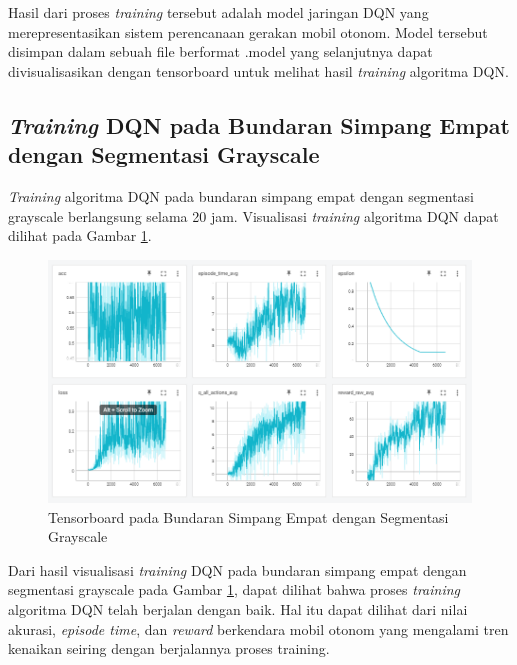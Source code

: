 Hasil dari proses \textit{training} tersebut adalah model jaringan DQN yang merepresentasikan sistem perencanaan gerakan mobil otonom. Model tersebut disimpan dalam sebuah file berformat .model yang selanjutnya dapat divisualisasikan dengan tensorboard untuk melihat hasil \textit{training} algoritma DQN.

\subsection{\textit{Training} DQN pada Bundaran Simpang Empat dengan Segmentasi Grayscale}
\label{sec:training_dqn_bundaran_simpangempat_segmentasi_grayscale}

\textit{Training} algoritma DQN pada bundaran simpang empat dengan segmentasi grayscale berlangsung selama 20 jam. Visualisasi \textit{training} algoritma DQN dapat dilihat pada Gambar \ref{fig:tensorboard_bundaran_simpangempat_segmentasi_grayscale}.

\begin{figure}[H] 
	\centering
	\includegraphics[width=1\linewidth]{images/tensorboard_bundaran_simpangempat_segmentasi_grayscale}
	\caption{Tensorboard pada Bundaran Simpang Empat dengan Segmentasi Grayscale}
	\label{fig:tensorboard_bundaran_simpangempat_segmentasi_grayscale}
\end{figure}

Dari hasil visualisasi \textit{training} DQN pada bundaran simpang empat dengan segmentasi grayscale pada Gambar \ref{fig:tensorboard_bundaran_simpangempat_segmentasi_grayscale}, dapat dilihat bahwa proses \textit{training} algoritma DQN telah berjalan dengan baik. Hal itu dapat dilihat dari nilai akurasi, \textit{episode time}, dan \textit{reward} berkendara mobil otonom yang mengalami tren kenaikan seiring dengan berjalannya proses training.

